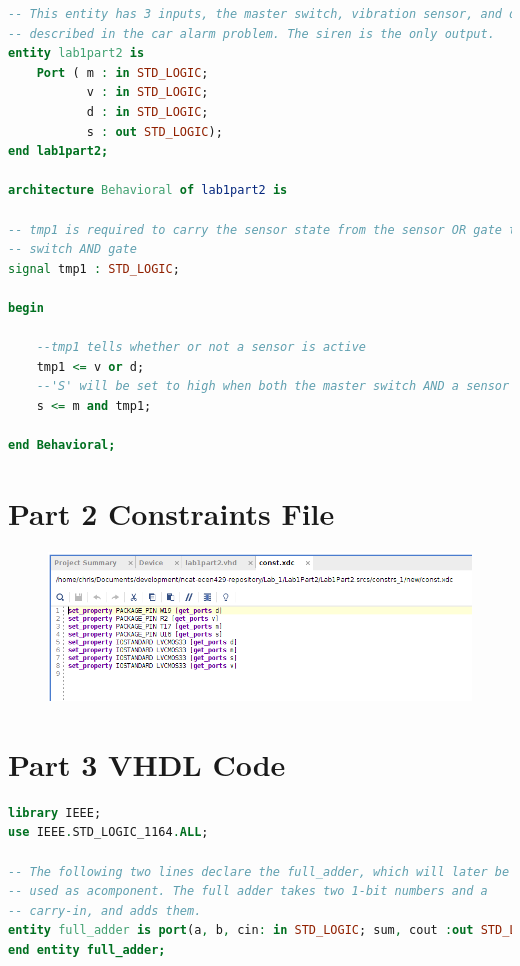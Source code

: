 \documentclass[11pt]{article}
\begin{document}
\begin{appendices}
\begin{lstlisting}[language=VHDL]
-- This entity has 3 inputs, the master switch, vibration sensor, and door sensor
-- described in the car alarm problem. The siren is the only output.
entity lab1part2 is
    Port ( m : in STD_LOGIC;
           v : in STD_LOGIC;
           d : in STD_LOGIC;
           s : out STD_LOGIC);
end lab1part2;

architecture Behavioral of lab1part2 is

-- tmp1 is required to carry the sensor state from the sensor OR gate to the master
-- switch AND gate
signal tmp1 : STD_LOGIC;

begin

    --tmp1 tells whether or not a sensor is active
    tmp1 <= v or d;
    --'S' will be set to high when both the master switch AND a sensor are active
    s <= m and tmp1;

end Behavioral;
\end{lstlisting}

\pagebreak

\section{Part 2 Constraints File}

\begin{figure}[h]
	\includegraphics[width=\textwidth]{report_images/img6}
\end{figure}

\section{Part 3 VHDL Code}

\begin{lstlisting}[language=VHDL]
library IEEE;
use IEEE.STD_LOGIC_1164.ALL;

-- The following two lines declare the full_adder, which will later be
-- used as acomponent. The full adder takes two 1-bit numbers and a 
-- carry-in, and adds them.
entity full_adder is port(a, b, cin: in STD_LOGIC; sum, cout :out STD_LOGIC);
end entity full_adder;


\end{lstlisting}
\end{appendices}
\end{document}
